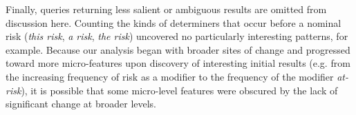 			Finally, queries returning less salient or ambiguous results are omitted from discussion here. Counting the kinds of determiners that occur before a nominal risk (\emph{this risk}, \emph{a risk}, \emph{the risk}) uncovered no particularly interesting patterns, for example. Because our analysis began with broader sites of change and progressed toward more micro-features upon discovery of interesting initial results (e.g. from the increasing frequency of risk as a modifier to the frequency of the modifier \emph{at-risk}), it is possible that some micro-level features were obscured by the lack of significant change at broader levels.








